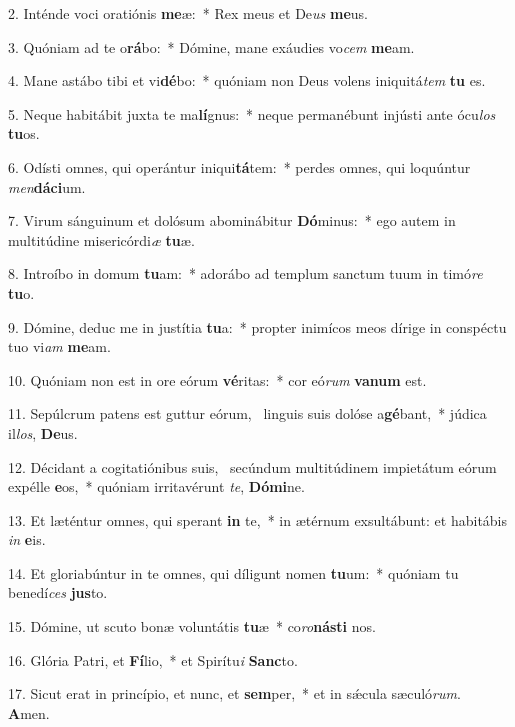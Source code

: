 2. Inténde voci oratiónis \textbf{me}æ:~*  Rex meus et De\textit{us} \textbf{me}us.\

3. Quóniam ad te o\textbf{rá}bo:~*  Dómine, mane exáudies vo\textit{cem} \textbf{me}am.\

4. Mane astábo tibi et vi\textbf{dé}bo:~*  quóniam non Deus volens iniquitá\textit{tem} \textbf{tu} es.\

5. Neque habitábit juxta te ma\textbf{lí}gnus:~*  neque permanébunt injústi ante ócu\textit{los} \textbf{tu}os.\

6. Odísti omnes, qui operántur iniqui\textbf{tá}tem:~*  perdes omnes, qui loquúntur \textit{men}\textbf{dá}\textbf{ci}um.\

7. Virum sánguinum et dolósum abominábitur \textbf{Dó}minus:~*  ego autem in multitúdine misericórdi\textit{æ} \textbf{tu}æ.\

8. Introíbo in domum \textbf{tu}am:~*  adorábo ad templum sanctum tuum in timó\textit{re} \textbf{tu}o.\

9. Dómine, deduc me in justítia \textbf{tu}a:~*  propter inimícos meos dírige in conspéctu tuo vi\textit{am} \textbf{me}am.\

10. Quóniam non est in ore eórum \textbf{vé}ritas:~*  cor eó\textit{rum} \textbf{va}\textbf{num} est.\

11. Sepúlcrum patens est guttur eórum, \dag\  linguis suis dolóse a\textbf{gé}bant,~*  júdica il\textit{los}, \textbf{De}us.\

12. Décidant a cogitatiónibus suis, \dag\  secúndum multitúdinem impietátum eórum expélle \textbf{e}os,~*  quóniam irritavérunt \textit{te}, \textbf{Dó}\textbf{mi}ne.\

13. Et læténtur omnes, qui sperant \textbf{in} te,~*  in ætérnum exsultábunt: et habitábis \textit{in} \textbf{e}is.\

14. Et gloriabúntur in te omnes, qui díligunt nomen \textbf{tu}um:~*  quóniam tu benedí\textit{ces} \textbf{jus}to.\

15. Dómine, ut scuto bonæ voluntátis \textbf{tu}æ~*  co\textit{ro}\textbf{nás}\textbf{ti} nos.\

16. Glória Patri, et \textbf{Fí}lio,~*  et Spirítu\textit{i} \textbf{Sanc}to.\

17. Sicut erat in princípio, et nunc, et \textbf{sem}per,~*  et in sǽcula sæculó\textit{rum}. \textbf{A}men.\

